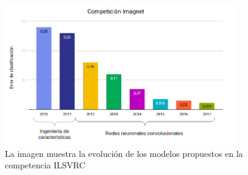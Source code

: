 \begin{figure}
	\centering
	\includegraphics[width=0.9\textwidth]{img/imgnet-grafico.png}
	\caption{La imagen muestra la evolución de los modelos propuestos en la competencia ILSVRC}
	\label{fig:EvolucionILSVRC}
\end{figure}

